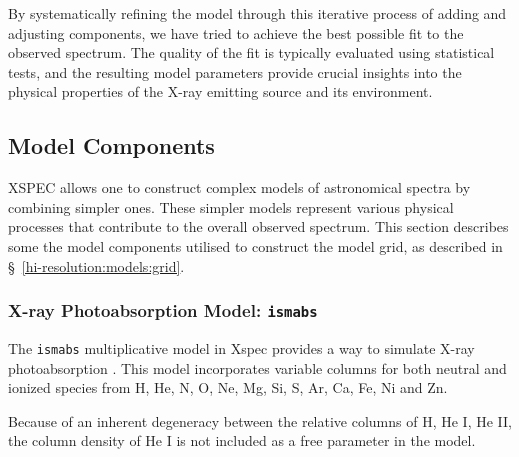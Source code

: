 			By systematically refining the model through this iterative process of adding and adjusting components, we have tried to achieve the best possible fit to the observed spectrum. The quality of the fit is typically evaluated using statistical tests, and the resulting model parameters provide crucial insights into the physical properties of the X-ray emitting source and its environment.
	  
	
		\subsection{Model Components} \label{hi-resolution:models:components}
			XSPEC allows one to construct complex models of astronomical spectra by combining simpler ones. These simpler models represent various physical processes that contribute to the overall observed spectrum. This section describes some the model components utilised to construct the model grid, as described in \S\ \ref{hi-resolution:models:grid}.
		
			\subsubsection{X-ray Photoabsorption Model: \texttt{ismabs}}
			The \texttt{ismabs} multiplicative model in Xspec provides a way to simulate X-ray photoabsorption \cite{gatuzz2015ismabs}. This model incorporates variable columns for both neutral and ionized species from H, He, N, O, Ne, Mg, Si, S, Ar, Ca, Fe, Ni and Zn.
			
			Because of an inherent degeneracy between the relative columns of H, He I, He II, the column density of He I is not included as a free parameter in the model.
			
